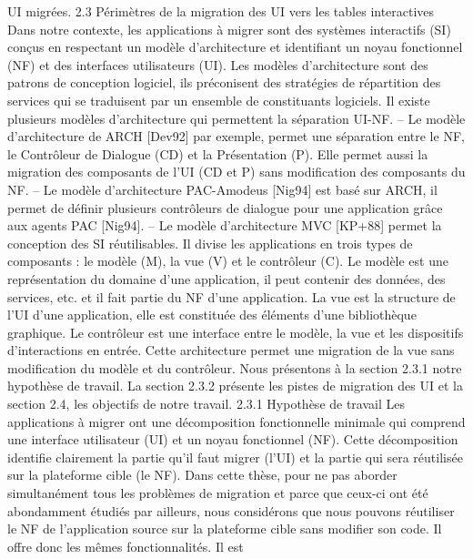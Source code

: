 \documentclass{article}
\begin{document}
UI migr\'{e}es.
2.3
P\'{e}rim\`{e}tres de la migration des UI vers les tables interactives
Dans notre contexte, les applications \`{a} migrer sont des syst\`{e}mes interactifs (SI) con\c{c}us en respectant un mod\`{e}le d’architecture et identiﬁant un noyau fonctionnel (NF) et des interfaces utilisateurs
(UI). Les mod\`{e}les d’architecture sont des patrons de conception logiciel, ils pr\'{e}conisent des strat\'{e}gies de r\'{e}partition des services qui se traduisent par un ensemble de constituants logiciels. Il existe
plusieurs mod\`{e}les d’architecture qui permettent la s\'{e}paration UI-NF.
– Le mod\`{e}le d’architecture de ARCH [Dev92] par exemple, permet une s\'{e}paration entre le NF,
le Contr\^{o}leur de Dialogue (CD) et la Pr\'{e}sentation (P). Elle permet aussi la migration des composants de l’UI (CD et P) sans modiﬁcation des composants du NF.
– Le mod\`{e}le d’architecture PAC-Amodeus [Nig94] est bas\'{e} sur ARCH, il permet de d\'{e}ﬁnir plusieurs contr\^{o}leurs de dialogue pour une application gr\^{a}ce aux agents PAC [Nig94].
– Le mod\`{e}le d’architecture MVC [KP+88] permet la conception des SI r\'{e}utilisables. Il divise
les applications en trois types de composants : le mod\`{e}le (M), la vue (V) et le contr\^{o}leur (C).
Le mod\`{e}le est une repr\'{e}sentation du domaine d’une application, il peut contenir des donn\'{e}es,
des services, etc. et il fait partie du NF d’une application. La vue est la structure de l’UI d’une
application, elle est constitu\'{e}e des \'{e}l\'{e}ments d’une biblioth\`{e}que graphique. Le contr\^{o}leur est
une interface entre le mod\`{e}le, la vue et les dispositifs d’interactions en entr\'{e}e. Cette architecture
permet une migration de la vue sans modiﬁcation du mod\`{e}le et du contr\^{o}leur.
Nous pr\'{e}sentons \`{a} la section 2.3.1 notre hypoth\`{e}se de travail. La section 2.3.2 pr\'{e}sente les pistes
de migration des UI et la section 2.4, les objectifs de notre travail.
2.3.1
Hypoth\`{e}se de travail
Les applications \`{a} migrer ont une d\'{e}composition fonctionnelle minimale qui comprend une interface utilisateur (UI) et un noyau fonctionnel (NF). Cette d\'{e}composition identiﬁe clairement la partie
qu’il faut migrer (l’UI) et la partie qui sera r\'{e}utilis\'{e}e sur la plateforme cible (le NF). Dans cette th\`{e}se,
pour ne pas aborder simultan\'{e}ment tous les probl\`{e}mes de migration et parce que ceux-ci ont \'{e}t\'{e} abondamment \'{e}tudi\'{e}s par ailleurs, nous consid\'{e}rons que nous pouvons r\'{e}utiliser le NF de l’application
source sur la plateforme cible sans modiﬁer son code. Il offre donc les m\^{e}mes fonctionnalit\'{e}s. Il est
\end{document}

